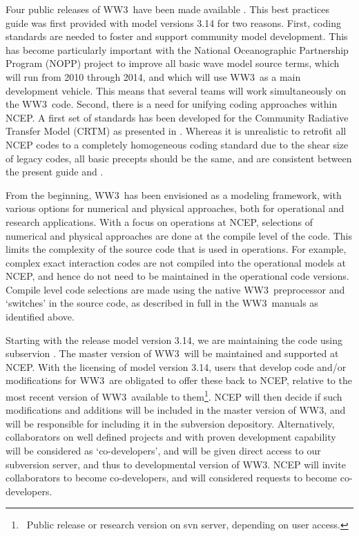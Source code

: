\documentclass[12pt]{article}
\newcommand{\ws}{WW3}
\begin{document}
Four public releases of \ws\ have been made available
\citep{tol:OMB99a,tol:OMB02c, tol:MMAB09a, tol:MMABmanual}. This best
practices guide was first provided with model versions 3.14 for two
reasons. First, coding standards are needed to foster and support community
model development. This has become particularly important with the National
Oceanographic Partnership Program (NOPP) project to improve all basic wave
model source terms, which will run from 2010 through 2014, and which will use
\ws\ as a main development vehicle. This means that several teams will work
simultaneously on the \ws\ code. Second, there is a need for unifying coding
approaches within NCEP. A first set of standards has been developed for the
Community Radiative Transfer Model (CRTM) as presented in
\cite{rep:PvD08}. Whereas it is unrealistic to retrofit all NCEP codes to a
completely homogeneous coding standard due to the shear size of legacy codes,
all basic precepts should be the same, and are consistent between the present
guide and \cite{rep:PvD08}.

From the beginning, \ws\ has been envisioned as a modeling framework, with
various options for numerical and physical approaches, both for operational
and research applications. With a focus on operations at NCEP, selections of
numerical and physical approaches are done at the compile level of the
code. This limits the complexity of the source code that is used in
operations. For example, complex exact interaction codes are not compiled into
the operational models at NCEP, and hence do not need to be maintained in the
operational code versions. Compile level code selections are made using the
native \ws\ preprocessor and `switches' in the source code, as described in
full in the \ws\ manuals as identified above.

Starting with the release model version 3.14, we are maintaining the code
using subservion \citep{bk:CSea06}. The master version of \ws\ will be
maintained and supported at NCEP. With the licensing of model version 3.14,
users that develop code and/or modifications for \ws\ are obligated to offer
these back to NCEP, relative to the most recent version of \ws\ available to
them\footnote{~Public release or research version on svn server, depending on
user access.}. NCEP will then decide if such modifications and additions will
be included in the master version of \ws, and will be responsible for
including it in the subversion depository. Alternatively, collaborators on
well defined projects and with proven development capability will be
considered as `co-developers', and will be given direct access to our
subversion server, and thus to developmental version of \ws. NCEP will invite
collaborators to become co-developers, and will considered requests to become
co-developers.
\end{document}
